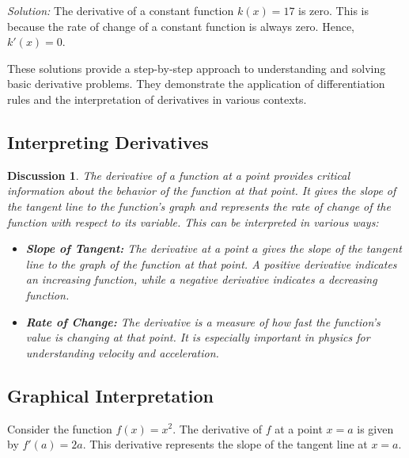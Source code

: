 \documentclass[a4paper,12pt]{book}
\newcounter{problem}
\newenvironment{solution}[1][]
{\par\noindent\textit{Solution:} \rmfamily}{\medskip}
\newtheorem{discussion}{Discussion}
\begin{document}
\begin{solution}[to Exercise 4]
The derivative of a constant function \( k(x) = 17 \) is zero. This is because the rate of change of a constant function is always zero. Hence, \( k'(x) = 0 \).
\end{solution}

These solutions provide a step-by-step approach to understanding and solving basic derivative problems. They demonstrate the application of differentiation rules and the interpretation of derivatives in various contexts.

\subsection{Interpreting Derivatives}

\begin{discussion}
The derivative of a function at a point provides critical information about the behavior of the function at that point. It gives the slope of the tangent line to the function's graph and represents the rate of change of the function with respect to its variable. This can be interpreted in various ways:

\begin{itemize}
    \item \textbf{Slope of Tangent:} The derivative at a point \(a\) gives the slope of the tangent line to the graph of the function at that point. A positive derivative indicates an increasing function, while a negative derivative indicates a decreasing function.
    \item \textbf{Rate of Change:} The derivative is a measure of how fast the function's value is changing at that point. It is especially important in physics for understanding velocity and acceleration.
\end{itemize}
\end{discussion}

\subsection{Graphical Interpretation}
Consider the function \( f(x) = x^2 \). The derivative of \( f \) at a point \( x = a \) is given by \( f'(a) = 2a \). This derivative represents the slope of the tangent line at \( x = a \).
\end{document}
